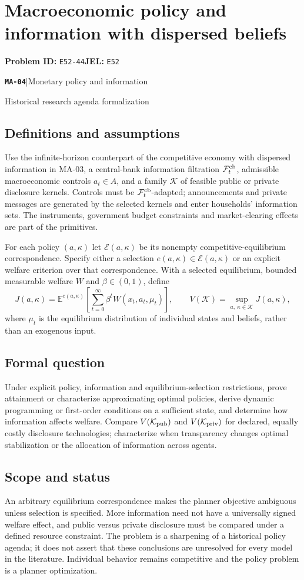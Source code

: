 \documentclass[11pt,a4paper]{article}
\newcommand{\E}{\mathbb E}
\newcommand{\entrymeta}[3]{{\sffamily\small\color{muted}\textbf{\texttt{#1}}\quad|\quad #2\par #3\par}}
\begin{document}
\section*{Macroeconomic policy and information with dispersed beliefs}
\textbf{Problem ID:} \texttt{E52-44}\quad \textbf{JEL:} \texttt{E52}\par
\label{problem:OP-0585}
\label{beyond:MA-04}
\entrymeta{MA-04}{Monetary policy and information}{Historical research agenda formalization}
\subsection*{Definitions and assumptions}
Use the infinite-horizon counterpart of the competitive economy with dispersed information in MA-03, a central-bank information filtration $\mathcal F_t^{\rm cb}$, admissible macroeconomic controls $a_t\in A$, and a family $\mathcal K$ of feasible public or private disclosure kernels. Controls must be $\mathcal F_t^{\rm cb}$-adapted; announcements and private messages are generated by the selected kernels and enter households' information sets. The instruments, government budget constraints and market-clearing effects are part of the primitives.

For each policy $(a,\kappa)$ let $\mathcal E(a,\kappa)$ be its nonempty competitive-equilibrium correspondence. Specify either a selection $e(a,\kappa)\in\mathcal E(a,\kappa)$ or an explicit welfare criterion over that correspondence. With a selected equilibrium, bounded measurable welfare $W$ and $\beta\in(0,1)$, define
\[
 J(a,\kappa)=\E^{e(a,\kappa)}\!\left[
 \sum_{t=0}^{\infty}\beta^tW(x_t,a_t,\mu_t)\right],\qquad
 V(\mathcal K)=\sup_{a,\ \kappa\in\mathcal K}J(a,\kappa),
\]
where $\mu_t$ is the equilibrium distribution of individual states and beliefs, rather than an exogenous input.
\subsection*{Formal question}
Under explicit policy, information and equilibrium-selection restrictions, prove attainment or characterize approximating optimal policies, derive dynamic programming or first-order conditions on a sufficient state, and determine how information affects welfare. Compare $V(\mathcal K_{\rm pub})$ and $V(\mathcal K_{\rm priv})$ for declared, equally costly disclosure technologies; characterize when transparency changes optimal stabilization or the allocation of information across agents.
\subsection*{Scope and status}
An arbitrary equilibrium correspondence makes the planner objective ambiguous unless selection is specified. More information need not have a universally signed welfare effect, and public versus private disclosure must be compared under a defined resource constraint. The problem is a sharpening of a historical policy agenda; it does not assert that these conclusions are unresolved for every model in the literature. Individual behavior remains competitive and the policy problem is a planner optimization.
\end{document}
